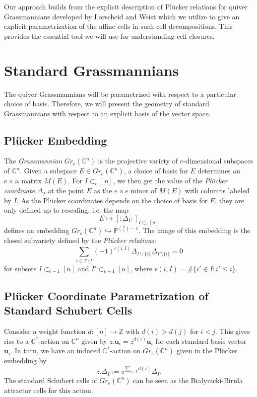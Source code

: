 \documentclass{amsart}
\numberwithin{equation}{section}
\newcommand{\CC}{\mathbb{C}}
\newcommand{\PP}{\mathbb{P}}
\newcommand{\ZZ}{\mathbb{Z}}
\newcommand{\bfu}{\mathbf{u}}
\newcommand{\into}{\hookrightarrow}
\begin{document}
  Our approach builds from the explicit description of Pl\"ucker relations for quiver Grassmannians developed by Lorscheid and Weist \cite{lorscheid-weist} which we utilize to give an explicit parametrization of the affine cells in such cell decompositions.
  This provides the essential tool we will use for understanding cell closures.

\section{Standard Grassmannians}

  The quiver Grassmannians will be parametrized with respect to a particular choice of basis.
  Therefore, we will present the geometry of standard Grassmannians with respect to an explicit basis of the vector space.

  \subsection{Pl\"ucker Embedding}
  The \emph{Grassmannian} $Gr_e(\CC^n)$ is the projective variety of $e$-dimensional subspaces of $\CC^n$.
  Given a subspace $E \in Gr_e(\CC^n)$, a choice of basis for $E$ determines an $e\times n$ matrix $M(E)$.
  For $I \subset_e [n]$, we then get the value of the \emph{Pl\"ucker coordinate} $\Delta_I$ at the point $E$ as the $e\times e$ minor of $M(E)$ with columns labeled by $I$.
  As the Pl\"ucker coordinates depends on the choice of basis for $E$, they are only defined up to rescaling, i.e. the map
  \[E \mapsto [:\Delta_I:]_{I\subset_e[n]}\]
  defines an embedding $Gr_e(\CC^n)\into \PP^{{n \choose e} - 1}$.
  The image of this embedding is the closed subvariety defined by the \emph{Pl\"ucker relations}:
  \begin{equation}
    \label{eq:plucker}
    \sum_{i\in I'\setminus I} (-1)^{\epsilon(i,I)} \Delta_{I\cup\{i\}} \Delta_{I'\setminus\{i\}}=0
  \end{equation}
  for subsets $I \subset_{e-1} [n]$ and $I' \subset_{e+1} [n]$, where $\epsilon(i,I)=\#\{i'\in I:i'\le i\}$.

  \subsection{Pl\"ucker Coordinate Parametrization of Standard Schubert Cells}
  Consider a weight function $d:[n] \to \ZZ$ with $d(i)>d(j)$ for $i<j$.
  This gives rise to a $\CC^*$-action on $\CC^n$ given by $z.\bfu_i=z^{d(i)} \bfu_i$ for each standard basis vector $\bfu_i$. 
  In turn, we have an induced $\CC^*$-action on $Gr_e(\CC^n)$ given in the Pl\"ucker embedding by 
  \[z.\Delta_I:=z^{\sum_{i\in I} d(i)}\Delta_I.\]
  The standard Schubert cells of $Gr_e(\CC^n)$ can be seen as the Bia\l{}ynicki-Birula attractor cells \cite{bb} for this action.
\end{document}
